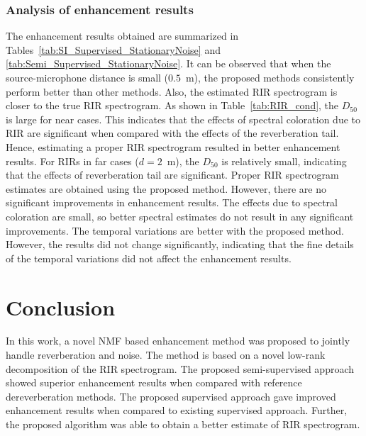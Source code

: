 \subsubsection{Analysis of enhancement results}
The enhancement results obtained are summarized in Tables~\ref{tab:SI_Supervised_StationaryNoise} and \ref{tab:Semi_Supervised_StationaryNoise}. It can be observed that when the source-microphone distance is small ($0.5$~m), the proposed methods consistently perform better than other methods. Also, the estimated RIR spectrogram is closer to the true RIR spectrogram. As shown in Table~\ref{tab:RIR_cond}, the $D_{50}$ is large for near cases. This indicates that the effects of spectral coloration due to RIR are significant when compared with the effects of the reverberation tail. Hence, estimating a proper RIR spectrogram resulted in better enhancement results. For RIRs in far cases ($d = 2$~m), the $D_{50}$ is relatively small, indicating that the effects of reverberation tail are significant.
Proper RIR spectrogram estimates are obtained using the proposed method. However, there are no significant improvements in enhancement results. The effects due to spectral coloration are small, so better spectral estimates do not result in any significant improvements. The temporal variations are better with the proposed method. However, the results did not change significantly, indicating that the fine details of the temporal
variations did not affect the enhancement results.

\section{Conclusion}
In this work, a novel NMF based enhancement method was proposed to jointly handle reverberation and noise. The method is based on a novel low-rank decomposition of the RIR spectrogram. The proposed semi-supervised approach showed superior enhancement results when compared with reference dereverberation methods. The proposed supervised approach gave improved enhancement results when compared to existing supervised approach. Further, the proposed algorithm was able to obtain a better estimate of RIR spectrogram. 

